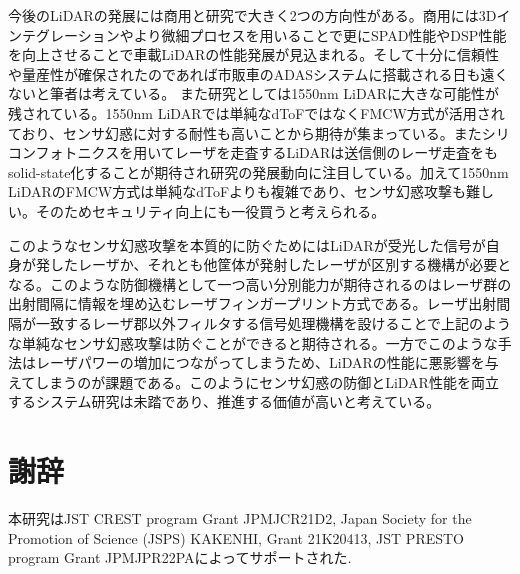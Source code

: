 \documentclass[twocolumn, 11pt, a4j]{article}
\begin{document}
今後のLiDARの発展には商用と研究で大きく2つの方向性がある。商用には3Dインテグレーションやより微細プロセスを用いることで更にSPAD性能やDSP性能を向上させることで車載LiDARの性能発展が見込まれる。そして十分に信頼性や量産性が確保されたのであれば市販車のADASシステムに搭載される日も遠くないと筆者は考えている。
また研究としては1550nm LiDARに大きな可能性が残されている。1550nm LiDARでは単純なdToFではなくFMCW方式が活用されており、センサ幻惑に対する耐性も高いことから期待が集まっている\cite{aptivpatent}。またシリコンフォトニクスを用いてレーザを走査するLiDARは送信側のレーザ走査をもsolid-state化することが期待され研究の発展動向に注目している。加えて1550nm LiDARのFMCW方式は単純なdToFよりも複雑であり、センサ幻惑攻撃も難しい。そのためセキュリティ向上にも一役買うと考えられる。

このようなセンサ幻惑攻撃を本質的に防ぐためにはLiDARが受光した信号が自身が発したレーザか、それとも他筐体が発射したレーザが区別する機構が必要となる。このような防御機構として一つ高い分別能力が期待されるのはレーザ群の出射間隔に情報を埋め込むレーザフィンガープリント方式である。レーザ出射間隔が一致するレーザ郡以外フィルタする信号処理機構を設けることで上記のような単純なセンサ幻惑攻撃は防ぐことができると期待される。一方でこのような手法はレーザパワーの増加につながってしまうため、LiDARの性能に悪影響を与えてしまうのが課題である。このようにセンサ幻惑の防御とLiDAR性能を両立するシステム研究は未踏であり、推進する価値が高いと考えている。

\section*{謝辞}
\footnotesize
本研究はJST CREST program Grant JPMJCR21D2, Japan Society for the Promotion of Science (JSPS) KAKENHI, Grant 21K20413, JST PRESTO program Grant JPMJPR22PAによってサポートされた.



{\footnotesize
}
\end{document}
